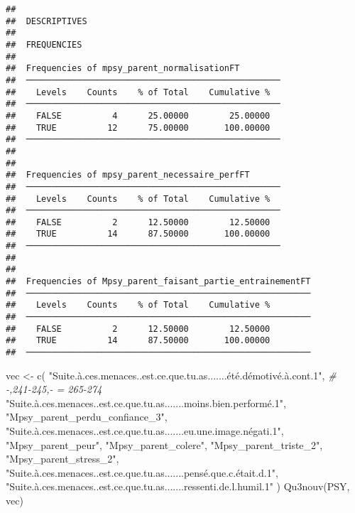 \documentclass[
]{article}
\newenvironment{Shaded}{\begin{snugshade}}{\end{snugshade}}
\newcommand{\CommentTok}[1]{\textcolor[rgb]{0.56,0.35,0.01}{\textit{#1}}}
\newcommand{\FunctionTok}[1]{\textcolor[rgb]{0.00,0.00,0.00}{#1}}
\newcommand{\NormalTok}[1]{#1}
\newcommand{\OtherTok}[1]{\textcolor[rgb]{0.56,0.35,0.01}{#1}}
\newcommand{\StringTok}[1]{\textcolor[rgb]{0.31,0.60,0.02}{#1}}
\begin{document}
\begin{verbatim}
## 
##  DESCRIPTIVES
## 
##  FREQUENCIES
## 
##  Frequencies of mpsy_parent_normalisationFT         
##  ────────────────────────────────────────────────── 
##    Levels    Counts    % of Total    Cumulative %   
##  ────────────────────────────────────────────────── 
##    FALSE          4      25.00000        25.00000   
##    TRUE          12      75.00000       100.00000   
##  ────────────────────────────────────────────────── 
## 
## 
##  Frequencies of mpsy_parent_necessaire_perfFT       
##  ────────────────────────────────────────────────── 
##    Levels    Counts    % of Total    Cumulative %   
##  ────────────────────────────────────────────────── 
##    FALSE          2      12.50000        12.50000   
##    TRUE          14      87.50000       100.00000   
##  ────────────────────────────────────────────────── 
## 
## 
##  Frequencies of Mpsy_parent_faisant_partie_entrainementFT 
##  ──────────────────────────────────────────────────────── 
##    Levels    Counts    % of Total    Cumulative %   
##  ──────────────────────────────────────────────────────── 
##    FALSE          2      12.50000        12.50000   
##    TRUE          14      87.50000       100.00000   
##  ────────────────────────────────────────────────────────
\end{verbatim}

\begin{Shaded}
\begin{Highlighting}[]
\NormalTok{vec }\OtherTok{\textless{}{-}} \FunctionTok{c}\NormalTok{(}
  \StringTok{"Suite.à.ces.menaces..est.ce.que.tu.as.......été.démotivé.à.cont.1"}\NormalTok{,   }\CommentTok{\# {-},241{-}245,{-} = 265{-}274}
  \StringTok{"Suite.à.ces.menaces..est.ce.que.tu.as.......moins.bien.performé.1"}\NormalTok{,}
  \StringTok{"Mpsy\_parent\_perdu\_confiance\_3"}\NormalTok{,}
  \StringTok{"Suite.à.ces.menaces..est.ce.que.tu.as.......eu.une.image.négati.1"}\NormalTok{,}
  \StringTok{"Mpsy\_parent\_peur"}\NormalTok{,}
  \StringTok{"Mpsy\_parent\_colere"}\NormalTok{,}
  \StringTok{"Mpsy\_parent\_triste\_2"}\NormalTok{,}
  \StringTok{"Mpsy\_parent\_stress\_2"}\NormalTok{,}
  \StringTok{"Suite.à.ces.menaces..est.ce.que.tu.as.......pensé.que.c.était.d.1"}\NormalTok{,}
   \StringTok{"Suite.à.ces.menaces..est.ce.que.tu.as.......ressenti.de.l.humil.1"}
\NormalTok{)}
\FunctionTok{Qu3nouv}\NormalTok{(PSY, vec)}
\end{Highlighting}
\end{Shaded}
\end{document}
